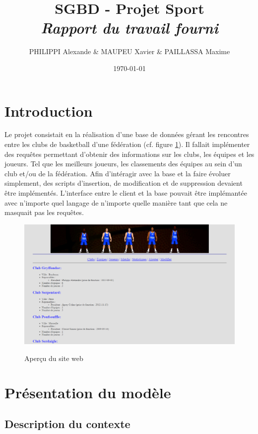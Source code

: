 \documentclass[a4paper,8pt,french,fleqn]{report}
\title{\textbf{SGBD - Projet Sport }\\\textit{Rapport du travail fourni}}
\author{PHILIPPI Alexande \& MAUPEU Xavier \& PAILLASSA Maxime}
\date{\today}
\begin{document}
\maketitle

\newpage

\tableofcontents

\newpage

\chapter*{Introduction}

Le projet consistait en la réalisation d'une base de données gérant les rencontres entre les clubs de basketball d'une fédération (cf. figure \ref{fig:website}). Il fallait implémenter des requêtes permettant d'obtenir des informations sur les clubs, les équipes et les joueurs. Tel que les meilleurs joueurs, les classements des équipes au sein d'un club et/ou de la fédération. Afin d'intéragir avec la base et la faire évoluer simplement, des scripts d'insertion, de modification et de suppression devaient être implémentés. L'interface entre le client et la base pouvait être implémantée avec n'importe quel langage de n'importe quelle manière tant que cela ne masquait pas les requêtes.

\begin{figure}[h]
  \centering
    \includegraphics[scale=0.45]{site.png}
    \label{fig:website}
    \caption{Aperçu du site web}
\end{figure}

\chapter{Présentation du modèle}

\section{Description du contexte}
\end{document}

